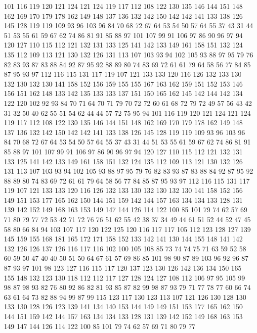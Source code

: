 101 116 119 120 121 124 121 124 119 117 112 108 122 130 135 146 144 151 148 162
169 170 179 178 162 149 148 137 136 132 142 150 142 142 141 133 138 126 145 128
119 119 109 93 96 103 96 84 70 68 72 67 64 53 54 50 57 64 55 37
43 31 44 51 53 55 61 59 67 62 74 86 81 91 85 88 97 101 107 99
91 106 97 86 90 96 97 94 120 127 110 115 112 121 132 131 133 125 141 142
133 149 161 158 151 132 124 135 112 109 113 121 130 132 126 131 113 107 103 93
94 102 105 93 88 97 95 79 76 82 83 93 87 83 88 84 92 87 95 92
88 89 80 74 83 69 72 61 61 79 64 58 56 77 84 85 87 95 93 97
112 116 115 131 117 119 107 121 133 133 120 116 126 132 133 130 132 130 132 130
141 158 152 156 159 155 155 167 163 162 159 151 152 153 146 156 151 162 148 133
142 135 133 133 137 151 150 165 162 145 142 144 142 134 122 120 102 92 93 84
70 71 64 70 71 79 70 72 72 60 61 68 72 79 72 49 57 56 43 42
31 32 50 40 62 55 51 54 62 44 44 57 72 75 95 94 101 116 119 120
121 124 121 124 119 117 112 108 122 130 135 146 144 151 148 162 169 170 179 178
162 149 148 137 136 132 142 150 142 142 141 133 138 126 145 128 119 119 109 93
96 103 96 84 70 68 72 67 64 53 54 50 57 64 55 37 43 31 44 51
53 55 61 59 67 62 74 86 81 91 85 88 97 101 107 99 91 106 97 86
90 96 97 94 120 127 110 115 112 121 132 131 133 125 141 142 133 149 161 158
151 132 124 135 112 109 113 121 130 132 126 131 113 107 103 93 94 102 105 93
88 97 95 79 76 82 83 93 87 83 88 84 92 87 95 92 88 89 80 74
83 69 72 61 61 79 64 58 56 77 84 85 87 95 93 97 112 116 115 131
117 119 107 121 133 133 120 116 126 132 133 130 132 130 132 130 141 158 152 156
149 151 153 177 165 162 150 144 151 159 142 144 157 163 134 134 133 128 131 139
142 152 149 168 163 153 149 147 144 126 114 122 100 85 101 79 74 62 57 69
71 80 79 77 72 53 42 71 72 76 76 51 62 55 42 38 37 34 49 44
61 51 52 44 52 47 45 58 80 66 84 94 103 107 117 120 122 125 120 116
117 117 105 112 123 128 127 139 145 159 155 168 181 165 172 171 158 152 133 142
141 130 144 155 148 141 142 132 126 126 137 126 116 117 116 102 100 105 108 85
73 74 74 75 71 63 59 52 58 60 59 50 47 40 40 50 51 50 64 67
61 57 69 86 85 101 98 90 87 89 103 96 92 96 87 87 93 97 101 98
123 127 116 115 117 120 137 123 130 126 142 136 134 150 165 155 148 132 123 130
118 112 112 117 127 128 124 127 108 112 106 97 95 105 99 98 87 98 93 82
76 80 92 86 82 81 93 85 87 82 99 98 87 93 79 71 77 78 77 60
66 74 63 61 64 73 82 88 94 99 87 99 115 123 117 130 123 113 107 121
126 130 128 130 133 130 128 126 123 139 141 134 140 153 144 149 149 151 153 177
165 162 150 144 151 159 142 144 157 163 134 134 133 128 131 139 142 152 149 168
163 153 149 147 144 126 114 122 100 85 101 79 74 62 57 69 71 80 79 77
